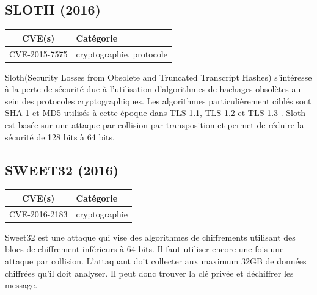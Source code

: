

\subsection{SLOTH (2016)}

\begin{tabularx}{0.96\textwidth}{|c|X|}
  \hline
  \textbf{CVE(s)} & \textbf{Catégorie} \\
  \hline
  CVE-2015-7575 & cryptographie, protocole \\
  \hline
\end{tabularx}

\vspace{1em}

Sloth(Security Losses from Obsolete and Truncated Transcript Hashes) s'intéresse à la perte de sécurité due à l'utilisation d'algorithmes de hachages obsolètes au sein des protocoles cryptographiques. Les algorithmes particulièrement ciblés sont SHA-1 et MD5 utilisés à cette époque dans TLS 1.1, TLS 1.2 et TLS 1.3 . Sloth est basée sur une attaque par collision par transposition et permet de réduire la sécurité de 128 bits à 64 bits\cite{sloth}.




\subsection{SWEET32 (2016)}

\begin{tabularx}{0.96\textwidth}{|c|X|}
  \hline
  \textbf{CVE(s)} & \textbf{Catégorie} \\
  \hline
  CVE-2016-2183 & cryptographie \\
  \hline
\end{tabularx}

\vspace{1em}

Sweet32 est une attaque qui vise des algorithmes de chiffrements utilisant des blocs de chiffrement inférieurs à 64 bits. Il faut utiliser encore une fois une attaque par collision. L'attaquant doit collecter aux maximum 32GB de données chiffrées qu'il doit analyser. Il peut donc trouver la clé privée et déchiffrer les message\cite{sweet32}.


